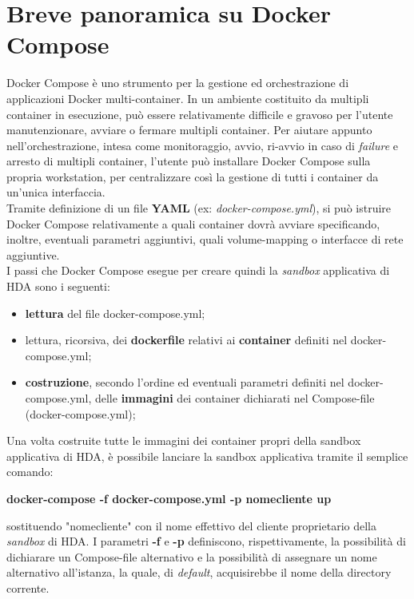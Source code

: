 \section{Breve panoramica su Docker Compose}
Docker Compose è uno strumento per la gestione ed orchestrazione di applicazioni Docker multi-container. In un ambiente costituito da multipli container in esecuzione, può essere relativamente difficile e gravoso per l'utente manutenzionare, avviare o fermare multipli container. Per aiutare appunto nell'orchestrazione, intesa come monitoraggio, avvio, ri-avvio in caso di \textit{failure} e arresto di multipli container, l'utente può installare Docker Compose sulla propria workstation, per centralizzare così la gestione di tutti i container da un'unica interfaccia.\\
Tramite definizione di un file \textbf{YAML} (ex: \textit{docker-compose.yml}), si può istruire Docker Compose relativamente a quali container dovrà avviare specificando, inoltre, eventuali parametri aggiuntivi, quali volume-mapping o interfacce di rete aggiuntive.\\
I passi che Docker Compose esegue per creare quindi la \textit{sandbox} applicativa di HDA sono i seguenti:
\begin{itemize}
	\item \textbf{lettura} del file docker-compose.yml;
	\item lettura, ricorsiva, dei \textbf{dockerfile} relativi ai \textbf{container} definiti nel docker-compose.yml;
	\item \textbf{costruzione}, secondo l'ordine ed eventuali parametri definiti nel docker-compose.yml, delle \textbf{immagini} dei container dichiarati nel Compose-file (docker-compose.yml);
\end{itemize}
Una volta costruite tutte le immagini dei container propri della sandbox applicativa di HDA, è possibile lanciare la sandbox applicativa tramite il semplice comando: \centerline{\textbf{docker-compose
-f docker-compose.yml -p nomecliente up}} sostituendo "nomecliente" con il nome effettivo del cliente proprietario della \textit{sandbox} di HDA. I parametri \textbf{-f} e \textbf{-p} definiscono, rispettivamente, la possibilità di dichiarare un Compose-file alternativo e la possibilità di assegnare un nome alternativo all'istanza, la quale, di \textit{default}, acquisirebbe il nome della directory corrente.



